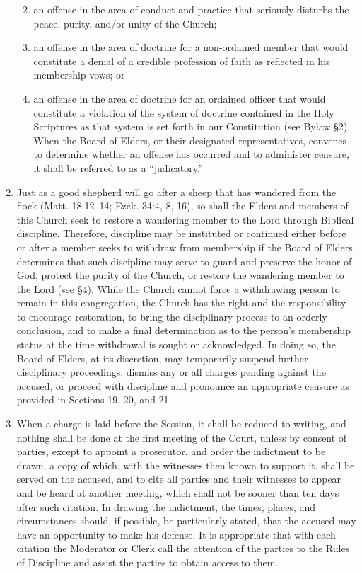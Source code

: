 \documentclass[
]{book}
\providecommand{\tightlist}{%
  \setlength{\itemsep}{0pt}\setlength{\parskip}{0pt}}
\begin{document}
\begin{enumerate}
  \begin{enumerate}
  \def\labelenumii{\alph{enumii}.}
  \tightlist
  \item
    an offense in the area of conduct and practice that seriously disturbs the peace, purity, and/or unity of the Church;
  \item
    an offense in the area of doctrine for a non-ordained member that would constitute a denial of a credible profession of faith as reflected in his membership vows; or
  \item
    an offense in the area of doctrine for an ordained officer that would constitute a violation of the system of doctrine contained in the Holy Scriptures as that system is set forth in our Constitution (see Bylaw §2).
    When the Board of Elders, or their designated representatives, convenes to determine whether an offense has occurred and to administer censure, it shall be referred to as a ``judicatory.''
  \end{enumerate}
\item
  Just as a good shepherd will go after a sheep that has wandered from the flock (Matt. 18:12--14; Ezek. 34:4, 8, 16), so shall the Elders and members of this Church seek to restore a wandering member to the Lord through Biblical discipline. Therefore, discipline may be instituted or continued either before or after a member seeks to withdraw from membership if the Board of Elders determines that such discipline may serve to guard and preserve the honor of God, protect the purity of the Church, or restore the wandering member to the Lord (see §4). While the Church cannot force a withdrawing person to remain in this congregation, the Church has the right and the responsibility to encourage restoration, to bring the disciplinary process to an orderly conclusion, and to make a final determination as to the person's membership status at the time withdrawal is sought or acknowledged. In doing so, the Board of Elders, at its discretion, may temporarily suspend further disciplinary proceedings, dismiss any or all charges pending against the accused, or proceed with discipline and pronounce an appropriate censure as provided in Sections 19, 20, and 21.
\item
  When a charge is laid before the Session, it shall be reduced to writing, and nothing shall be done at the first meeting of the Court, unless by consent of parties, except to appoint a prosecutor, and order the indictment to be drawn, a copy of which, with the witnesses then known to support it, shall be served on the accused, and to cite all parties and their witnesses to appear and be heard at another meeting, which shall not be sooner than ten days after such citation. In drawing the indictment, the times, places, and circumstances should, if possible, be particularly stated, that the accused may have an opportunity to make his defense. It is appropriate that with each citation the Moderator or Clerk call the attention of the parties to the Rules of Discipline and assist the parties to obtain access to them.

\end{enumerate}
\end{document}
